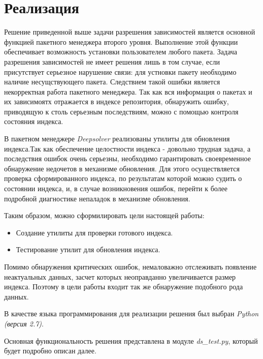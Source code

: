 \section{Реализация}
Решение приведенной выше задачи разрешения зависимостей является основной
функцией пакетного менеджера второго уровня. Выполнение этой функции обеспечивает
возможность установки пользователем любого пакета. Задача разрешения
зависимостей не имеет решения лишь в том случае, если присутствует
серьезное нарушение связи: для устновки пакету необходимо наличие
несущствующего пакета. Следствием такой ошибки является некорректная 
работа пакетного менеджера. Так как вся информация о пакетах и их 
зависимоятх отражается в индексе репозитория, обнаружить ошибку,
приводящую к столь серьезным последствиям, можно с помощью
контроля состояния индекса.

В пакетном менеджере \textit{Deepsolver} реализованы утилиты для обновления индекса.Так как обеспечение целостности индекса - довольно трудная задача, а 
последствия ошибок очень серьезны, необходимо гарантировать своевременное
обнаружение недочетов в механизме обновления. Для этого осуществляется
проверка сформированного индекса, по результатам которой можно
судить о состоянии индекса, и, в случае возникновения ошибок, перейти
к более подробной диагностике непаладок в механизме обновления. 

Таким образом, можно сформилировать цели настоящей работы:
\begin{itemize}
\item{Создание утилиты для проверки готового индекса.}
\item{Тестирование утилит для обновления индекса.}
\end{itemize}

Помимо обнаружения критических ошибок, немаловажно отслеживать 
появление неактуальных данных, засчет которых неоправданно 
увеличивается размер индекса. Поэтому в цели работы входит
так же обнаружение подобного рода данных.

В качестве языка программирования для реализации решения был выбран \textit{Python (версия 2.7)}.

Основная функциональность решения представлена в модуле \textit{ds\_test.py}, который
будет подробно описан далее.

